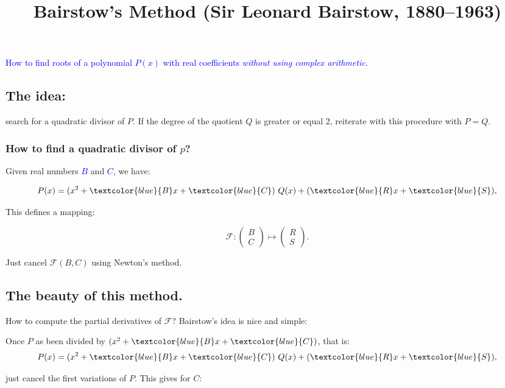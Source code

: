 \documentclass[11pt]{amsart}
\title{Bairstow's Method (Sir Leonard Bairstow,
    1880--1963)}
\begin{document}
\maketitle


  \begin{center}
    \textcolor{blue}{\large How to find roots of a polynomial  $P(x)$
      with real coefficients 
        \emph{without using complex arithmetic.}}
  \end{center}
   \subsection*{The idea:}    

  search for a quadratic divisor of $P$. If the degree of the quotient $Q$
  is greater or equal 2, reiterate with this procedure with $P=Q$.

  \subsubsection*{How to find a quadratic divisor of $p$?} 
 

  Given real numbers \textcolor{blue}{$B$} and \textcolor{blue}{$C$},
  we have:

  $$P(x)= (x^2+\textcolor{blue}{B}x+\textcolor{blue}{C})\ Q(x)+ (\textcolor{blue}{R}x+\textcolor{blue}{S}),$$

  This defines a mapping:
  
$$\mathcal{F}: \begin{pmatrix}B \\ C  \end{pmatrix}
\mapsto  \begin{pmatrix}R\\S\end{pmatrix}.$$

  Just cancel $\mathcal{F}(B,C)$ using Newton's method.

  \subsection*{The beauty of this method.}
  
How to compute the partial derivatives of  $\mathcal{F}$? 
Bairstow's idea  is  nice and simple:

Once $P$ as been divided by
$(x^2+\textcolor{blue}{B}x+\textcolor{blue}{C})$, that is:
$$P(x)= (x^2+\textcolor{blue}{B}x+\textcolor{blue}{C})\ Q(x)+ (\textcolor{blue}{R}x+\textcolor{blue}{S}),$$

just cancel the first variations of $P$. This gives for $C$:
\end{document}
